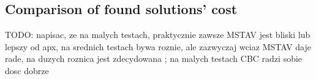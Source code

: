 \subsection{Comparison of found solutions' cost}
TODO: napisac, ze na malych testach, praktycznie zawsze MSTAV jest bliski lub lepszy od apx,
na srednich testach bywa roznie, ale zazwyczaj wciaz MSTAV daje rade,
na duzych roznica jest zdecydowana ; na malych testach CBC radzi sobie dosc dobrze

\begin{figure}[ht]
  \centering
  
\end{figure}

\begin{figure}[ht]
  \centering
  
\end{figure}

\begin{figure}[ht]
  \centering
  
\end{figure}

\begin{figure}[ht]
  \centering
  
\end{figure}


